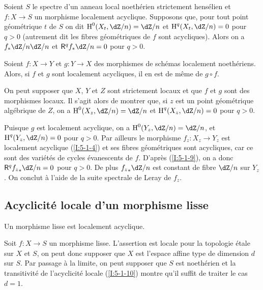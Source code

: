 \begin{corollary}\label{I:5-1-9}
Soient $S$ le spectre d'un anneau local noethérien strictement hensélien et 
$f:X\to S$ un morphisme localement acyclique. Supposons que, pour tout point 
géométrique $t$ de $S$ on dit $\h^0(X_t,\dZ/n) = \dZ/n$ et 
$\h^q(X_t,\dZ/n) = 0$ pour $q>0$ (autrement dit les fibres géométriques de 
$f$ sont acycliques). Alors on a $f_* \dZ/n\dZ/n$ et $\R^qf_*\dZ/n = 0$ pour 
$q>0$. 
\end{corollary}





\begin{corollary}\label{I:5-1-10}
Soient $f:X\to Y$ et $g:Y\to X$ des morphismes de schémas localement 
noethériens. Alors, si $f$ et $g$ sont localement acycliques, il en est de 
même de $g\circ f$. 
\end{corollary}

On peut supposer que $X$, $Y$ et $Z$ sont strictement locaux et que $f$ et $g$ 
sont des morphismes locaux. Il s'agit alors de montrer que, si $z$ est un point 
géométrique algébrique de $Z$, on a $\h^0(X_z,\dZ/n) = \dZ/n$ et 
$\h^q(X_z,\dZ/n) = 0$ pour $q>0$. 

Puisque $g$ est localement acyclique, on a $\h^0(Y_z,\dZ/n) = \dZ/n$, et 
$\h^q(Y_z,\dZ/n) = 0$ pour $q>0$. Par ailleurs le morphisme $f_z:X_z\to Y_z$ est 
localement acyclique (\ref{I:5-1-4}) et ses fibres géométriques sont 
acycliques, car ce sont des variétés de cycles évanescents de $f$. 
D'après (\ref{I:5-1-9}), on a donc $\R^q {f_z}_*\dZ/n = 0$ pour $q>0$. De plus 
${f_z}_*\dZ/n$ est constant de fibre $\dZ/n$ sur $Y_z$. On conclut à l'aide de 
la suite spectrale de Leray de $f_z$. 










\subsection{Acyclicité locale d'un morphisme lisse}\label{I:5-2}





\begin{theorem}\label{I:5-2-1}
Un morphisme lisse est localement acyclique.
\end{theorem}

Soit $f:X\to S$ un morphisme lisse. L'assertion est locale pour la topologie 
étale sur $X$ et $S$, on peut donc supposer que $X$ est l'espace affine type 
de dimension $d$ sur $S$. Par passage à la limite, on peut supposer que $S$ 
est noethérien et la transitivité de l'acyclicité locale (\ref{I:5-1-10}) montre 
qu'il suffit de traiter le cas $d=1$. 

